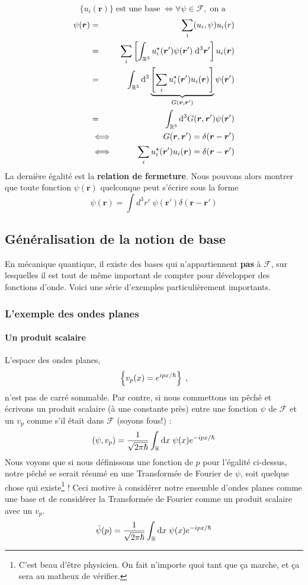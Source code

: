 \documentclass[../notesdecours.tex]{subfiles}
\begin{document}
$$\{u_i(\bm{r})\} \; \text{est une base} \; \iff \forall \psi \in \mathcal F, \;\text{on a }$$
\begin{eqnarray}
\psi(\bm{r}) &=& \sum_i (u_i, \psi) u_i(r) \\
&=& \sum_i \left[\int_{\mathbb R ^3} u_i ^\star(\bm{r}') \psi(\bm{r}') \; \mathrm{d} ^3 \bm{r}'\right] u_i(\bm{r}) \\
&=& \int_{\mathbb R ^3}\mathrm{d} ^3  \underbrace{\left[\sum_iu_i ^\star(\bm{r}')u_i(\bm{r}) \right]}_{G(\bm{r}, \bm{r}')}\psi(\bm{r}') \\
&=& \int_{\mathbb R ^3}\mathrm{d} ^3 G(\bm{r}, \bm{r}')\psi(\bm{r}') \\
&\iff& G(\bm{r}, \bm{r}') = \delta(\bm{r}-\bm{r}') \\
&\iff& \sum_iu_i ^\star(\bm{r}')u_i(\bm{r}) = \delta(\bm{r}-\bm{r}') 
\end{eqnarray}
La dernière égalité est la \textbf{relation de fermeture}. Nous pouvons alors montrer que toute fonction $\psi(\bm{r})$ quelconque peut s'écrire sous la forme
\begin{equation}
\psi(\bm{r}) = \int d^3r' \; \psi(\bm{r}') \delta (\bm{r} - \bm{r}')
\label{implication relation de fermeture}
\end{equation}
\subsection{Généralisation de la notion de base}
En mécanique quantique, il existe des bases qui n'appartiennent \textbf{pas} à $\mathcal F$, sur lesquelles il est tout de même important de compter pour développer des fonctions d'onde. Voici une série d'exemples particulièrement importants.
\subsubsection{L'exemple des ondes planes}
\paragraph{Un produit scalaire}
L'espace des ondes planes,
$$\left\{ v_p(x) = e^{ipx/\hbar}\right\}\; ,$$
n'est pas de carré sommable. Par contre, si nous commettons un pêché et écrivons un produit scalaire (à une constante près) entre une fonction $\psi$ de $\mathcal F$ et un $v_p$ comme s'il était dans $\mathcal F$ (soyons fous!) :
$$(\psi, v_p) = \dfrac{1}{\sqrt{2\pi\hbar}} \int_{\mathbb R}\mathrm{d} x \; \psi(x) e^{-ipx/\hbar}$$
Nous voyons que si nous définissons une fonction de $p$ pour l'égalité ci-dessus, notre pêché se serait résumé en une Transformée de Fourier de $\psi$, soit quelque chose qui existe\footnote{C'est beau d'être physicien. On fait n'importe quoi tant que ça marche, et ça sera au matheux de vérifier.} ! Ceci motive à considérer notre ensemble d'ondes planes comme une base et de considérer la Transformée de Fourier comme un produit scalaire avec un $v_p$.
$$\bar{\psi}(p) = \dfrac{1}{\sqrt{2\pi\hbar}} \int_{\mathbb R}\mathrm{d} x \; \psi(x) e^{-ipx/\hbar}$$
\end{document}
